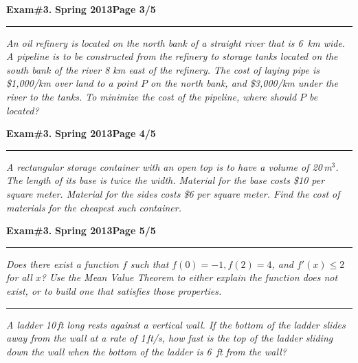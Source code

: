 \documentclass[12pt]{article}
\begin{document}
\hfill{\large\bf Exam\#3.}\hfill{\large\bf
  Spring 2013}\hfill{\large\bf Page 3/5}\hrule

\bigskip
{\problem[20 pts] \em An oil refinery is located on the north bank of a
straight river that is 6~km wide.  A pipeline is to be constructed from
the refinery to storage tanks located on the south bank of the river 8
km east of the refinery.  The cost of laying pipe is \$1,000/km over
land to a point $P$ on the north bank, and \$3,000/km under the river
to the tanks.  To minimize the cost of the pipeline, where should $P$ be
located?}

\vspace{18cm}
\begin{flushright}
\end{flushright}
\newpage

\hfill{\large\bf Exam\#3.}\hfill{\large\bf
  Spring 2013}\hfill{\large\bf Page 4/5}\hrule

\bigskip
{\problem[20 pts] \em A rectangular storage container with an open top
is to have a volume of 20\,m$^3$.  The length of its base is twice the
width.  Material for the base costs \$10 per square meter.  Material for
the sides costs \$6 per square meter.  Find the cost of materials for
the cheapest such container.}
\vspace{18cm}
\begin{flushright}
\end{flushright}
\newpage


\hfill{\large\bf Exam\#3.}\hfill{\large\bf
  Spring 2013}\hfill{\large\bf Page 5/5}\hrule

\bigskip
{\problem[10 pts] \em Does there exist a function $f$ such that $f(0)=-1,
f(2)=4$, and $f'(x)\leq 2$ for all $x$?  Use the Mean Value Theorem to
either explain the function does not exist, or to build one that
satisfies those properties.}
\vspace{8cm}
\hrule
{\problem[20 pts] \em A ladder 10\,ft long rests against a vertical wall.  If
the bottom of the ladder slides away from the wall at a rate of 1\,ft/s,
how fast is the top of the ladder sliding down the wall when the bottom
of the ladder is 6~ft from the wall?}
\vspace{10cm}
\begin{flushright}
\end{flushright}
\end{document}
